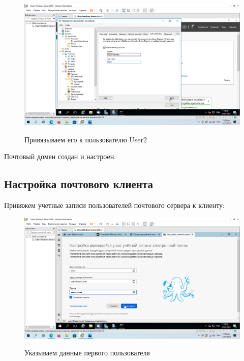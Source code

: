 \documentclass[a4paper]{article}
\begin{document}
  \begin{figure}[H]
    \centering
    \includegraphics[width=\textwidth]{11_0141}
    \label{img:141}
    \caption{Привязываем его к пользователю User2}
  \end{figure}

  Почтовый домен создан и настроен.

  \subsection{Настройка почтового клиента}

  Привяжем учетные записи пользователей почтового сервера к клиенту:

  \begin{figure}[H]
    \centering
    \includegraphics[width=\textwidth]{11_0142}
    \label{img:142}
    \caption{Указываем данные первого пользователя}
  \end{figure}
\end{document}
